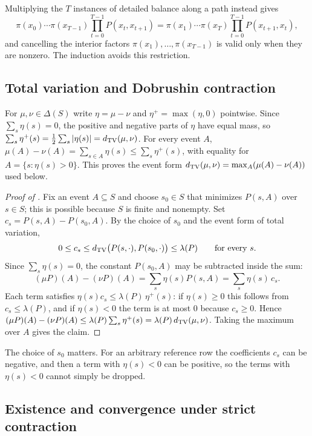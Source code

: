Multiplying the $T$ instances of detailed balance along a path instead gives
\[
  \pi(x_0)\cdots\pi(x_{T-1})\prod_{t=0}^{T-1}P(x_t,x_{t+1})=\pi(x_1)\cdots\pi(x_T)\prod_{t=0}^{T-1}P(x_{t+1},x_t),
\]
and cancelling the interior factors $\pi(x_1),\dots,\pi(x_{T-1})$ is valid only when they are nonzero.
The induction avoids this restriction.

\subsection{Total variation and Dobrushin contraction}

For $\mu,\nu\in\Delta(S)$ write $\eta=\mu-\nu$ and $\eta^+=\max(\eta,0)$ pointwise.
Since $\sum_s\eta(s)=0$, the positive and negative parts of $\eta$ have equal mass, so $\sum_s\eta^+(s)=\frac12\sum_s|\eta(s)|=d_{\mathrm{TV}}(\mu,\nu)$.
For every event $A$, $\mu(A)-\nu(A)=\sum_{s\in A}\eta(s)\le\sum_s\eta^+(s)$, with equality for $A=\{s:\eta(s)>0\}$.
This proves the event form $d_{\mathrm{TV}}(\mu,\nu)=\max_A(\mu(A)-\nu(A))$ used below.

\begin{proof}[Proof of ]
Fix an event $A\subseteq S$ and choose $s_0\in S$ that minimizes $P(s,A)$ over $s\in S$; this is possible because $S$ is finite and nonempty.
Set $c_s=P(s,A)-P(s_0,A)$.
By the choice of $s_0$ and the event form of total variation,
\[
  0\le c_s\le d_{\mathrm{TV}}\bigl(P(s,\cdot),P(s_0,\cdot)\bigr)\le\lambda(P)\qquad\text{for every }s.
\]
Since $\sum_s\eta(s)=0$, the constant $P(s_0,A)$ may be subtracted inside the sum:
\[
  (\mu P)(A)-(\nu P)(A)=\sum_s\eta(s)P(s,A)=\sum_s\eta(s)\,c_s.
\]
Each term satisfies $\eta(s)c_s\le\lambda(P)\,\eta^+(s)$: if $\eta(s)\ge 0$ this follows from $c_s\le\lambda(P)$, and if $\eta(s)<0$ the term is at most $0$ because $c_s\ge 0$.
Hence $(\mu P)(A)-(\nu P)(A)\le\lambda(P)\sum_s\eta^+(s)=\lambda(P)\,d_{\mathrm{TV}}(\mu,\nu)$.
Taking the maximum over $A$ gives the claim.
\end{proof}

The choice of $s_0$ matters.
For an arbitrary reference row the coefficients $c_s$ can be negative, and then a term with $\eta(s)<0$ can be positive, so the terms with $\eta(s)<0$ cannot simply be dropped.

\subsection{Existence and convergence under strict contraction}

